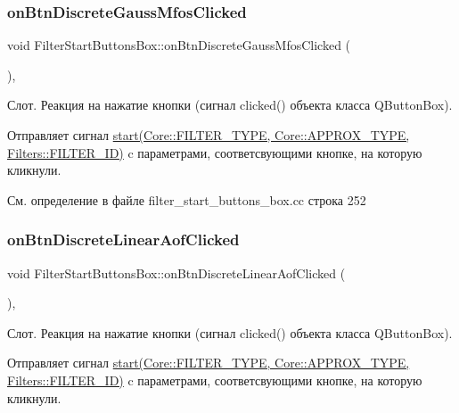 \subsubsection{\texorpdfstring{on\+Btn\+Discrete\+Gauss\+Mfos\+Clicked}{onBtnDiscreteGaussMfosClicked}}
{\footnotesize\ttfamily void Filter\+Start\+Buttons\+Box\+::on\+Btn\+Discrete\+Gauss\+Mfos\+Clicked (\begin{DoxyParamCaption}{ }\end{DoxyParamCaption})\hspace{0.3cm}{\ttfamily [private]}, {\ttfamily [slot]}}

Слот. Реакция на нажатие кнопки (сигнал clicked() объекта класса Q\+Button\+Box).

Отправляет сигнал \hyperlink{class_filter_start_buttons_box_ac6e2a6555f1d388391f188f834b8e753}{start(\+Core\+::\+F\+I\+L\+T\+E\+R\+\_\+\+T\+Y\+P\+E, Core\+::\+A\+P\+P\+R\+O\+X\+\_\+\+T\+Y\+P\+E, Filters\+::\+F\+I\+L\+T\+E\+R\+\_\+\+I\+D)} c параметрами, соответсвующими кнопке, на которую кликнули. 

См. определение в файле filter\+\_\+start\+\_\+buttons\+\_\+box.\+cc строка 252

\hypertarget{class_filter_start_buttons_box_ac9e49cc4f6c8d9712c807e1b0711f67a}{}\label{class_filter_start_buttons_box_ac9e49cc4f6c8d9712c807e1b0711f67a} 
\subsubsection{\texorpdfstring{on\+Btn\+Discrete\+Linear\+Aof\+Clicked}{onBtnDiscreteLinearAofClicked}}
{\footnotesize\ttfamily void Filter\+Start\+Buttons\+Box\+::on\+Btn\+Discrete\+Linear\+Aof\+Clicked (\begin{DoxyParamCaption}{ }\end{DoxyParamCaption})\hspace{0.3cm}{\ttfamily [private]}, {\ttfamily [slot]}}

Слот. Реакция на нажатие кнопки (сигнал clicked() объекта класса Q\+Button\+Box).

Отправляет сигнал \hyperlink{class_filter_start_buttons_box_ac6e2a6555f1d388391f188f834b8e753}{start(\+Core\+::\+F\+I\+L\+T\+E\+R\+\_\+\+T\+Y\+P\+E, Core\+::\+A\+P\+P\+R\+O\+X\+\_\+\+T\+Y\+P\+E, Filters\+::\+F\+I\+L\+T\+E\+R\+\_\+\+I\+D)} c параметрами, соответсвующими кнопке, на которую кликнули. 


